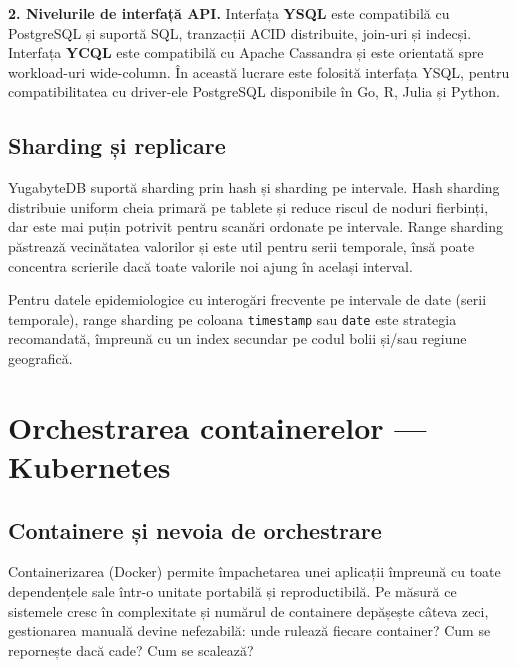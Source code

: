 \textbf{2. Nivelurile de interfață API.} Interfața \textbf{YSQL} este compatibilă
cu PostgreSQL și suportă SQL, tranzacții ACID distribuite, join-uri și indecși.
Interfața \textbf{YCQL} este compatibilă cu Apache Cassandra și este orientată
spre workload-uri wide-column. În această lucrare este folosită interfața YSQL,
pentru compatibilitatea cu driver-ele PostgreSQL disponibile în Go, R, Julia și
Python.

\subsection{Sharding și replicare}
\label{subsec:sharding}

YugabyteDB suportă sharding prin hash și sharding pe intervale. Hash sharding
distribuie uniform cheia primară pe tablete și reduce riscul de noduri fierbinți,
dar este mai puțin potrivit pentru scanări ordonate pe intervale. Range sharding
păstrează vecinătatea valorilor și este util pentru serii temporale, însă poate
concentra scrierile dacă toate valorile noi ajung în același interval.

\begin{observatie}
Pentru datele epidemiologice cu interogări frecvente pe intervale de date
(serii temporale), range sharding pe coloana \texttt{timestamp} sau
\texttt{date} este strategia recomandată, împreună cu un index secundar
pe codul bolii și/sau regiune geografică.
\end{observatie}

\section{Orchestrarea containerelor — Kubernetes}
\label{sec:kubernetes}

\subsection{Containere și nevoia de orchestrare}
\label{subsec:containere}

Containerizarea (Docker) permite împachetarea unei aplicații împreună cu
toate dependențele sale într-o unitate portabilă și reproductibilă.
Pe măsură ce sistemele cresc în complexitate și numărul de containere
depășește câteva zeci, gestionarea manuală devine nefezabilă: unde rulează
fiecare container? Cum se repornește dacă cade? Cum se scalează?

